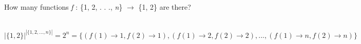 How many functions \textit{f} : \{1, 2, . . ., \textit{n}\} $\to$ \{1, 2\} are there?

\begin{solution}\ \\
\[|\{1, 2\}|^{|\{1,2, . . ., n\}|} = 2^n = \{(f(1) \to 1, f(2) \to 1), (f(1) \to 2, f(2) \to 2),..., (f(1) \to n, f(2) \to n)\}\]
\end{solution}